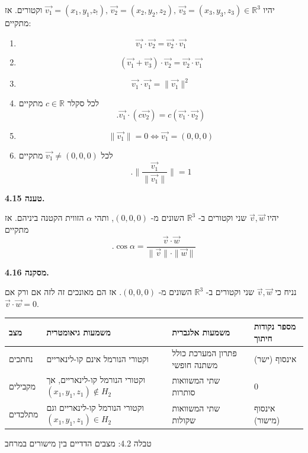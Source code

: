 \documentclass[12pt]{report}
\theoremstyle{plain}
\theoremstyle{definition}
\newcommand{\R}{\mathbb{R}}
\newcommand{\0}{\mathbf{0}}
\begin{document}
יהיו
$\vec{v_1}=(x_1,y_1\text{,}z_{!}),\,\vec{v_2}=(x_2,y_2,z_2),\,\vec{v_3}=(x_3,y_3,z_3)\in\R^3$
וקטורים. אז מתקיים:

\begin{enumerate}[label=\alph*.]

\item 
$$\vec{v_1}\cdot\vec{v_2}=\vec{v_2}\cdot\vec{v_1}$$


\item 
$$(\vec{v_1}+\vec{v_3})\cdot\vec{v_2}=\vec{v_2}\cdot\vec{v_1}$$


\item 
$$\vec{v_1}\cdot\vec{v_1}=\|\vec{v_1}\|^2$$


\item 
לכל סקלר 
$c\in\R$
מתקיים
$$.\vec{v_1}\cdot(c\vec{v_2})=c(\vec{v_1}\cdot\vec{v_2})$$


\item 
$${\|\vec{v_1}\|}=0\iff\vec{v_1}=(0,0,0)$$


\item
לכל
$\vec{v_1}\neq(0,0,0)$
מתקיים
$$.\|\frac{\vec{v_1}}{\|\vec{v_1}\|}\|=1$$


\end{enumerate}
\bigskip
\bigskip

\noindent\textbf{טענה 4.15.}

יהיו
$\vec{v},\vec{w}$
שני וקטורים ב-
$\R^3$
השונים מ-
$(0,0,0)$,
ותהי
$\alpha$
הזווית הקטנה ביניהם. אז מתקיים
$$	
.\cos\alpha=\frac{\vec{v}\cdot\vec{w}}{\|\vec{v}\|\cdot\|\vec{w}\|}	
$$
\bigskip
\bigskip

\noindent\textbf{מסקנה 4.16.}

נניח כי
$\vec{v},\vec{w}$
שני וקטורים ב-
$\R^3$
השונים מ-
$(0,0,0)$.
אז הם מאונכים זה לזה אם ורק אם
$\vec{v}\cdot\vec{w}=0$.
\bigskip
\bigskip

\begin{table}[H]
\centering
\begin{tabular}{|>{\raggedleft\arraybackslash}p{2.5cm}|>{\raggedleft\arraybackslash}p{3cm}|>{\raggedleft\arraybackslash}p{3cm}|>{\raggedleft\arraybackslash}p{2.5cm}|}
\hline
\texthebrew{\textbf{מצב}} & \texthebrew{\textbf{משמעות גיאומטרית}} & \texthebrew{\textbf{משמעות אלגברית}} & \texthebrew{\textbf{מספר נקודות חיתוך}} \\ \hline
\texthebrew{נחתכים} & \texthebrew{וקטורי הנורמל אינם קו-לינאריים} & \texthebrew{פתרון המערכת כולל משתנה חופשי} & \texthebrew{אינסוף (ישר)} \\ \hline
\texthebrew{מקבילים} & \texthebrew{וקטורי הנורמל קו-לינאריים, אך \newline \((x_1, y_1, z_1) \notin H_2\)} & \texthebrew{שתי המשוואות סותרות} & \texthebrew{0} \\ \hline
\texthebrew{מתלכדים} & \texthebrew{וקטורי הנורמל קו-לינאריים וגם \((x_1, y_1, z_1) \in H_2\)} & \texthebrew{שתי המשוואות שקולות} & \texthebrew{אינסוף (מישור)} \\ \hline
\end{tabular}

\smallskip
{\small טבלה 4.2: מצבים הדדיים בין מישורים במרחב}

\end{table}
\end{document}
